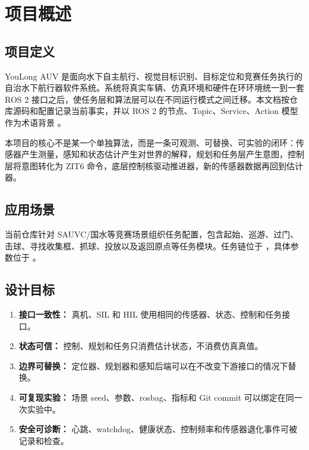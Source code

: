 \chapter{项目概述}
\label{ch:overview}

\section{项目定义}
YouLong AUV 是面向水下自主航行、视觉目标识别、目标定位和竞赛任务执行的自治水下航行器软件系统。系统将真实车辆、仿真环境和硬件在环环境统一到一套 ROS 2 接口之后，使任务层和算法层可以在不同运行模式之间迁移。本文档按仓库源码和配置记录当前事实，并以 ROS 2 的节点、Topic、Service、Action 模型作为术语背景 \cite{ros2docs,youlongrepo}。

本项目的核心不是某一个单独算法，而是一条可观测、可替换、可实验的闭环：传感器产生测量，感知和状态估计产生对世界的解释，规划和任务层产生意图，控制层将意图转化为 ZIT6 命令，底层控制核驱动推进器，新的传感器数据再回到估计器。

\section{应用场景}
当前仓库针对 SAUVC/国水等竞赛场景组织任务配置，包含起始、巡游、过门、击球、寻找收集框、抓球、投放以及返回原点等任务模块。任务链位于 ，具体参数位于 。

\section{设计目标}
\begin{enumerate}
  \item \textbf{接口一致性：} 真机、SIL 和 HIL 使用相同的传感器、状态、控制和任务接口。
  \item \textbf{状态可信：} 控制、规划和任务只消费估计状态，不消费仿真真值。
  \item \textbf{边界可替换：} 定位器、规划器和感知后端可以在不改变下游接口的情况下替换。
  \item \textbf{可复现实验：} 场景 seed、参数、rosbag、指标和 Git commit 可以绑定在同一次实验中。
  \item \textbf{安全可诊断：} 心跳、watchdog、健康状态、控制频率和传感器退化事件可被记录和检查。
\end{enumerate}

